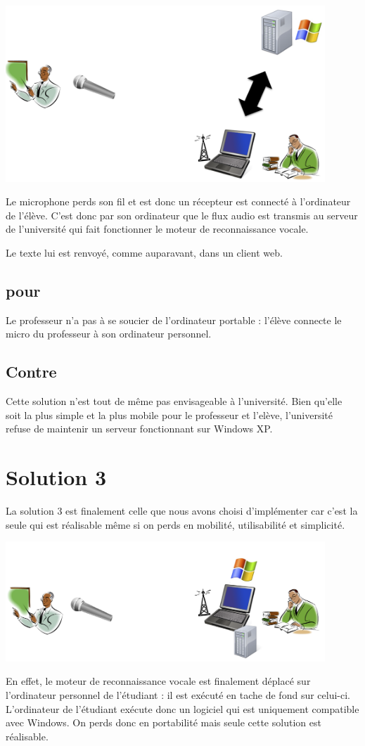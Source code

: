 \includegraphics[width=12cm]{img/solution2.png} 

Le microphone perds son fil et est donc un récepteur est connecté à l'ordinateur de l'élève.
C'est donc par son ordinateur que le flux audio est transmis au serveur de l'université qui fait fonctionner le moteur de reconnaissance vocale.

Le texte lui est renvoyé, comme auparavant, dans un client web.

\subsection{pour}
Le professeur n'a pas à se soucier de l'ordinateur portable : l'élève connecte le micro du professeur à son ordinateur personnel.

\subsection{Contre}
Cette solution n'est tout de même pas envisageable à l'université. Bien qu'elle soit la plus simple et la plus mobile pour le professeur et l'elève, l'université refuse de maintenir un serveur fonctionnant sur Windows XP.

\section{Solution 3}
La solution 3 est finalement celle que nous avons choisi d'implémenter car c'est la seule qui est réalisable même si on perds en mobilité, utilisabilité et simplicité.

\includegraphics[width=12cm]{img/solution3.png} 

En effet, le moteur de reconnaissance vocale est finalement déplacé sur l'ordinateur personnel de l'étudiant : il est exécuté en tache de fond sur celui-ci. L'ordinateur de l'étudiant exécute donc un logiciel qui est uniquement compatible avec Windows. On perds donc en portabilité mais seule cette solution est réalisable.
